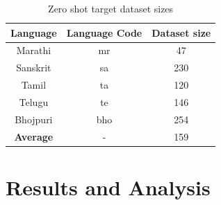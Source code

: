 \begin{table}[ht]
    \begin{center}
        \begin{tabular}{|c|c||c|}
            \hline
            \textbf{Language} & \textbf{Language Code} & \textbf{Dataset size} \\
            \hline
            Marathi & mr & 47 \\
            \hline
            Sanskrit & sa & 230 \\
            \hline
            Tamil & ta & 120 \\
            \hline
            Telugu & te & 146 \\
            \hline
            Bhojpuri & bho & 254 \\
            \hline
            \textbf{Average} & - & 159 \\
            \hline
        \end{tabular}
        \caption{Zero shot target dataset sizes}
        \label{table:zero_shot_dataset_sizes}
    \end{center}
\end{table}


\section{Results and Analysis}
